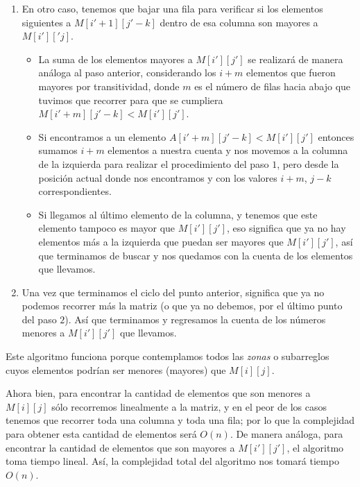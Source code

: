 \documentclass[letterpaper,11pt]{article}
\begin{document}
\begin{enumerate}
\begin{enumerate}
\begin{enumerate}
            \item En otro caso, tenemos que bajar una fila para verificar si los
            elementos siguientes a $M[i'+1][j'-k]$ dentro de esa columna son 
            mayores a $M[i']['j]$.
            \begin{itemize}
                \item La suma de los elementos mayores a $M[i'][j']$ se 
                realizará de manera análoga al paso anterior, considerando los 
                $i+m$ elementos que fueron mayores por transitividad, donde 
                $m$ es el número de filas hacia abajo que tuvimos que recorrer 
                para que se cumpliera $M[i'+m][j'-k] < M[i'][j']$.

                \item Si encontramos a un elemento $A[i'+m][j'-k] < M[i'][j']$
                entonces sumamos $i+m$ elementos a nuestra cuenta y nos movemos 
                a la columna de la izquierda para realizar el procedimiento del 
                paso $1$, pero desde la posición actual donde nos encontramos 
                y con los valores $i+m$, $j-k$ correspondientes.

                \item Si llegamos al último elemento de la columna, y tenemos 
                que este elemento tampoco es mayor que $M[i'][j']$, eso 
                significa que ya no hay elementos más a la izquierda que puedan 
                ser mayores que $M[i'][j']$, así que terminamos de buscar y nos 
                quedamos con la cuenta de los elementos que llevamos. 
            \end{itemize}

            \item Una vez que terminamos el ciclo del punto anterior, significa 
            que ya no podemos recorrer más la matriz (o que ya no debemos, por 
            el último punto del paso $2$). Así que terminamos y regresamos la 
            cuenta de los números menores a $M[i'][j']$ que llevamos.
        \end{enumerate}

        Este algoritmo funciona porque contemplamos todos las \textit{zonas} 
        o subarreglos cuyos elementos podrían ser menores (mayores) que 
        $M[i][j]$. 

        Ahora bien, para encontrar la cantidad de elementos que son menores a 
        $M[i][j]$ sólo recorremos linealmente a la matriz, y en el peor de los
        casos tenemos que recorrer toda una columna y toda una fila; por lo que 
        la complejidad para obtener esta cantidad de elementos será $O(n)$. De 
        manera análoga, para encontrar la cantidad de elementos que son mayores 
        a $M[i'][j']$, el algoritmo toma tiempo lineal. Así, la complejidad 
        total del algoritmo nos tomará tiempo $O(n)$.
    \end{enumerate}
    

\end{enumerate}
\end{document}
